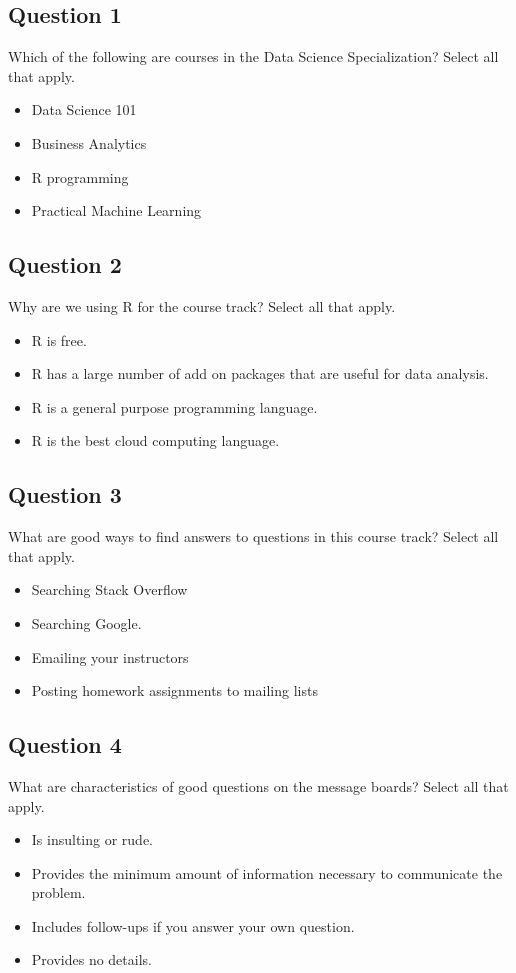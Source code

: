 \subsection*{Question 1}
Which of the following are courses in the Data Science Specialization? Select all that apply.
\begin{itemize}
\item Data Science 101
\item Business Analytics
\item R programming
\item Practical Machine Learning
\end{itemize}
\subsection*{Question 2}
Why are we using R for the course track? Select all that apply.
\begin{itemize}
\item R is free.
\item R has a large number of add on packages that are useful for data analysis.
\item R is a general purpose programming language.
\item R is the best cloud computing language.
\end{itemize}
\subsection*{Question 3}
What are good ways to find answers to questions in this course track? Select all that apply.
\begin{itemize}
\item  Searching Stack Overflow
\item Searching Google.
\item Emailing your instructors
\item Posting homework assignments to mailing lists
\end{itemize}
\subsection*{Question 4}
What are characteristics of good questions on the message boards? Select all that apply.
\begin{itemize}
\item Is insulting or rude.
\item Provides the minimum amount of information necessary to communicate the problem.
\item Includes follow-ups if you answer your own question.
\item Provides no details.
\end{itemize}

